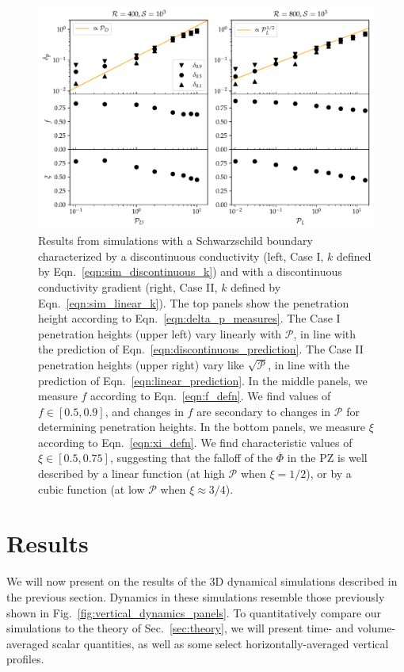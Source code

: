 \documentclass[twocolumn]{aastex631}
\newcommand{\mP}{\ensuremath{\mathcal{P}}}
\renewcommand{\bar}[1]{\overline{#1}}
\begin{document}
\begin{figure}[t]
\centering
\includegraphics[width=\textwidth]{parameters_vs_p.pdf}
\caption{
Results from simulations with a Schwarzschild boundary characterized by a discontinuous conductivity (left, Case I, $k$ defined by Eqn.~\ref{eqn:sim_discontinuous_k}) and with a discontinuous conductivity gradient (right, Case II, $k$ defined by Eqn.~\ref{eqn:sim_linear_k}).
The top panels show the penetration height according to Eqn.~\ref{eqn:delta_p_measures}.
The Case I penetration heights (upper left) vary linearly with $\mP$, in line with the prediction of Eqn.~\ref{eqn:discontinuous_prediction}.
The Case II penetration heights (upper right) vary like $\sqrt{\mP}$, in line with the prediction of Eqn.~\ref{eqn:linear_prediction}.
In the middle panels, we measure $f$ according to Eqn.~\ref{eqn:f_defn}.
We find values of $f \in [0.5, 0.9]$, and changes in $f$ are secondary to changes in $\mP$ for determining penetration heights.
In the bottom panels, we measure $\xi$ according to Eqn.~\ref{eqn:xi_defn}.
We find characteristic values of $\xi \in [0.5, 0.75]$, suggesting that the falloff of the $\bar{\Phi}$ in the PZ is well described by a linear function (at high $\mP$ when $\xi = 1/2$), or by a cubic function (at low $\mP$ when $\xi \approx 3/4$).
\label{fig:parameters_vs_p}
}
\end{figure}





\section{Results}
\label{sec:results}

We will now present on the results of the 3D dynamical simulations described in the previous section.
Dynamics in these simulations resemble those previously shown in Fig.~\ref{fig:vertical_dynamics_panels}.
To quantitatively compare our simulations to the theory of Sec.~\ref{sec:theory}, we will present time- and volume-averaged scalar quantities, as well as some select horizontally-averaged vertical profiles.
\end{document}
